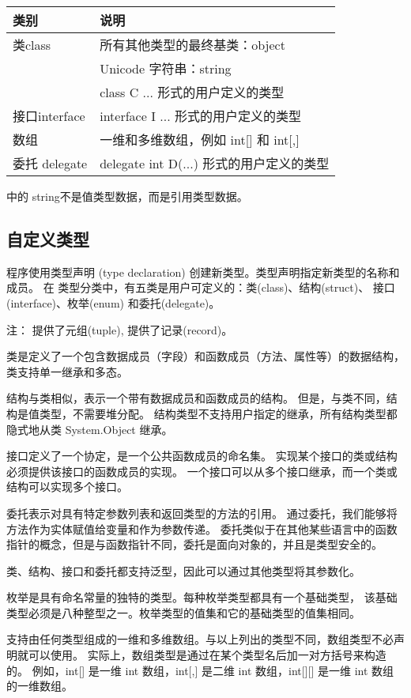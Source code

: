 \begin{tabular}{|l|l|}
\hline
类别          & 说明 \\
\hline
类class       &  所有其他类型的最终基类：object \\
              &  Unicode 字符串：string \\
              &  class C {...} 形式的用户定义的类型 \\
\hline
接口interface     & interface I {...} 形式的用户定义的类型  \\
数组              & 一维和多维数组，例如 int[] 和 int[,]  \\
委托 delegate     & delegate int D(...) 形式的用户定义的类型  \\
\hline
\end{tabular}

 \cs 中的 string不是值类型数据，而是引用类型数据。

\subsection{自定义类型}
 \cs  程序使用类型声明 (type declaration) 创建新类型。类型声明指定新类型的名称和成员。
在  \cs  类型分类中，有五类是用户可定义的：类(class)、结构(struct)、
接口(interface)、枚举(enum) 和委托(delegate)。

注： 提供了元组(tuple),  提供了记录(record)。


类是定义了一个包含数据成员（字段）和函数成员（方法、属性等）的数据结构，类支持单一继承和多态。

结构与类相似，表示一个带有数据成员和函数成员的结构。
但是，与类不同，结构是值类型，不需要堆分配。
结构类型不支持用户指定的继承，所有结构类型都隐式地从类 System.Object 继承。

接口定义了一个协定，是一个公共函数成员的命名集。
实现某个接口的类或结构必须提供该接口的函数成员的实现。
一个接口可以从多个接口继承，而一个类或结构可以实现多个接口。

委托表示对具有特定参数列表和返回类型的方法的引用。
通过委托，我们能够将方法作为实体赋值给变量和作为参数传递。
委托类似于在其他某些语言中的函数指针的概念，但是与函数指针不同，委托是面向对象的，并且是类型安全的。

类、结构、接口和委托都支持泛型，因此可以通过其他类型将其参数化。

枚举是具有命名常量的独特的类型。每种枚举类型都具有一个基础类型，
该基础类型必须是八种整型之一。枚举类型的值集和它的基础类型的值集相同。

 \cs  支持由任何类型组成的一维和多维数组。与以上列出的类型不同，数组类型不必声明就可以使用。
实际上，数组类型是通过在某个类型名后加一对方括号来构造的。
例如，int[] 是一维 int 数组，int[,] 是二维 int 数组，int[][] 是一维 int 数组的一维数组。

